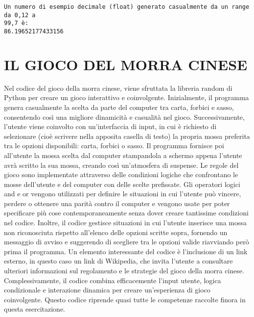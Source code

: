 \documentclass[11pt]{article}
\begin{document}
    \begin{Verbatim}[commandchars=\\\{\}]
Un numero di esempio decimale (float) generato casualmente da un range da 0,12 a
99,7 è:
86.19652177433156
    \end{Verbatim}

    \section{IL GIOCO DEL MORRA CINESE}\label{il-gioco-del-morra-cinese}

    Nel codice del gioco della morra cinese, viene sfruttata la libreria
random di Python per creare un gioco interattivo e coinvolgente.
Inizialmente, il programma genera casualmente la scelta da parte del
computer tra carta, forbici e sasso, consentendo così una migliore
dinamicità e casualità nel gioco. Successivamente, l'utente viene
coinvolto con un'interfaccia di input, in cui è richiesto di selezionare
(cioè scrivere nella apposita casella di testo) la propria mossa
preferita tra le opzioni disponibili: carta, forbici o sasso. Il
programma fornisce poi all'utente la mossa scelta dal computer
stampandola a schermo appena l'utente avrà scritto la sua mossa, creando
così un'atmosfera di suspense. Le regole del gioco sono implementate
attraverso delle condizioni logiche che confrontano le mosse dell'utente
e del computer con delle scelte prefissate. Gli operatori logici and e
or vengono utilizzati per definire le situazioni in cui l'utente può
vincere, perdere o ottenere una parità contro il computer e vengono
usate per poter specificare più cose contemporaneamente senza dover
creare tantissime condizioni nel codice. Inoltre, il codice gestisce
situazioni in cui l'utente inserisce una mossa non riconosciuta rispetto
all'elenco delle opzioni scritte sopra, fornendo un messaggio di avviso
e suggerendo di scegliere tra le opzioni valide riavviando però prima il
programma. Un elemento interessante del codice è l'inclusione di un link
esterno, in questo caso un link di Wikipedia, che invita l'utente a
consultare ulteriori informazioni sul regolamento e le strategie del
gioco della morra cinese. Complessivamente, il codice combina
efficacemente l'input utente, logica condizionale e interazione dinamica
per creare un'esperienza di gioco coinvolgente. Questo codice riprende
quasi tutte le competenze raccolte finora in questa esercitazione.
\end{document}
